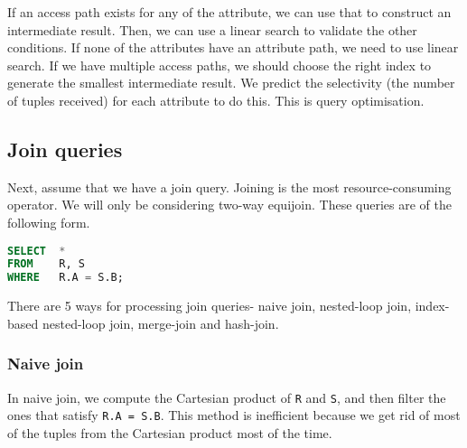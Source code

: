 \documentclass[a4paper, openany]{memoir}
\theoremstyle{definition}
\theoremstyle{plain}
\begin{document}
If an access path exists for any of the attribute, we can use that to construct an intermediate result. Then, we can use a linear search to validate the other conditions. If none of the attributes have an attribute path, we need to use linear search. If we have multiple access paths, we should choose the right index to generate the smallest intermediate result. We predict the selectivity (the number of tuples received) for each attribute to do this. This is query optimisation.

\subsection{Join queries}
Next, assume that we have a join query. Joining is the most resource-consuming operator. We will only be considering two-way equijoin. These queries are of the following form.
\begin{lstlisting}[language=SQL]
SELECT  *
FROM    R, S
WHERE   R.A = S.B;
\end{lstlisting}
There are 5 ways for processing join queries- naive join, nested-loop join, index-based nested-loop join, merge-join and hash-join.
\subsubsection{Naive join}
In naive join, we compute the Cartesian product of \texttt{R} and \texttt{S}, and then filter the ones that satisfy \texttt{R.A = S.B}. This method is inefficient because we get rid of most of the tuples from the Cartesian product most of the time.
\end{document}
